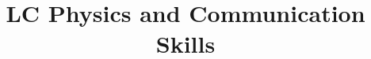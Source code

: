 \documentclass[a4paper]{article}
\title{LC Physics and Communication Skills}
\begin{document}
    \maketitle
    \hrulefill
    \tableofcontents
    
    
\end{document}
